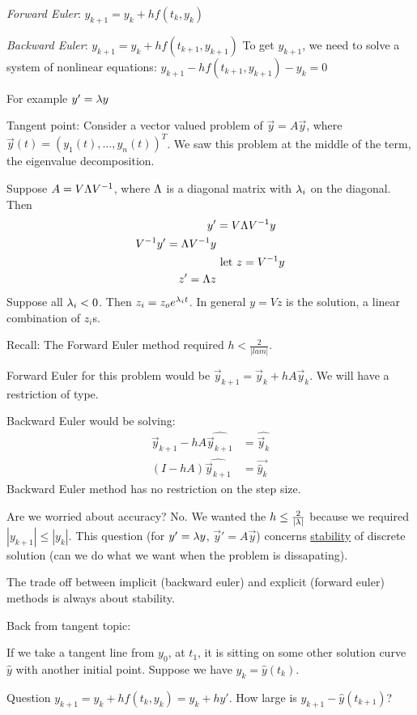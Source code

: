 \emph{Forward Euler}: $y_{k+1} = y_k + hf(t_k,y_k)$

\emph{Backward Euler}: $y_{k+1} = y_k + hf(t_{k+1},y_{k+1})$
To get $y_{k+1}$, we need to solve a system of nonlinear equations:
$y_{k+1}-hf(t_{k+1}, y_{k+1}) - y_{k} = 0$

For example $y' = \lambda y$

Tangent point: Consider a vector valued problem of $\vec y = A\vec y$,
where $\vec y(t) = (y_1(t), \dots, y_n(t))^T$. We saw this problem at
the middle of the term, the eigenvalue decomposition.

Suppose $A = V \Lambda V^{-1}$, where $\Lambda$ is a diagonal matrix with
$\lambda_i$ on the diagonal. Then
\begin{align*}
  y' &= V\Lambda V^{-1} y\\
V^{-1} y' = \Lambda V^{-1} y\\
&\text{ let }z=V^{-1} y\\
z' = \Lambda z
\end{align*}
Suppose all $\lambda_i<0$. Then $z_i = z_oe^{\lambda_i t}$. In general
$y=Vz$ is the solution, a linear combination of $z_i$s. 

Recall: The Forward Euler method required $h<\frac{2}{|lam|}$. 

Forward Euler for this problem would be $\vec y_{k+1} = \vec y_k + h A
\vec y_k$.  We will have a restriction of type.

Backward Euler would be solving:
\begin{align*}
\vec y_{k+1} - h A \hat{\vec y_{k+1}} &= \hat{\vec y_k}\\
 (I-hA)\hat{\vec y_{k+1}} &= \vec{ \hat y_k}
\end{align*}
Backward Euler method has no restriction on the step size.

Are we worried about accuracy? No. We wanted the $h\le
\frac{2}{|\lambda|}$ because we required $|y_{k+1}| \le |y_k|$.
This question (for $y' = \lambda y$, $\vec y' = A\vec y$) concerns
\underline{stability} of discrete solution (can we do what we want
when the problem is dissapating).

The trade off between implicit (backward euler) and explicit (forward euler) methods is always about
stability. 

Back from tangent topic:

If we take a tangent line from $y_0$, at $t_1$, it is sitting
on some other solution curve $\hat y$ with another initial point.
Suppose we have $y_k = \hat y(t_k)$. 

Question $y_{k+1} = y_k + hf(t_k, y_k) = y_k + hy'$. How large is $y_{k+1} - \hat y(t_{k+1})$? 

